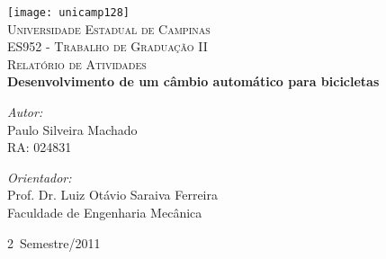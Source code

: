 %
%
%
% 
% 
%
\begin{titlepage}
\begin{center}
 
\texttt{[image: unicamp128]}\\[1cm]
\textsc{\LARGE Universidade Estadual de Campinas}\\[0.3cm]
\textsc{\LARGE ES952 - Trabalho de Graduação II}\\[3.0cm] 
\textsc{\Large Relatório de Atividades} \\[0.2cm]

  
\hfill
\textsf{ \LARGE \bfseries Desenvolvimento de um câmbio automático para
bicicletas}

\vfill
\begin{minipage}{0.49\textwidth}
\begin{flushleft} \large
\emph{Autor:}\\
Paulo Silveira Machado \\
RA: 024831
\end{flushleft}
\end{minipage}
\begin{minipage}{0.5\textwidth}
\begin{flushright} \large
\emph{Orientador:} \\
Prof. Dr. Luiz Otávio Saraiva Ferreira\\
Faculdade de Engenharia Mecânica
\end{flushright}
\end{minipage}
 
\vfill
 
{\large 2\textordmasculine ~Semestre/2011}
\end{center}
 
\end{titlepage}

\tableofcontents
\pagebreak

\listoffigures
\pagebreak

\listoftables
\pagebreak